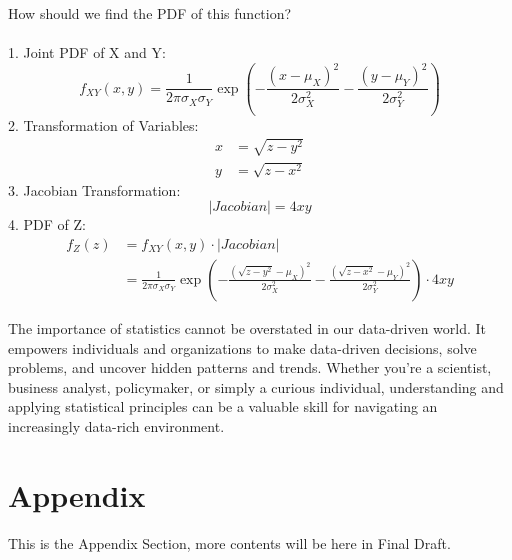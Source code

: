 \documentclass{article}
\begin{document}
How should we find the PDF of this function?\\\\
1. Joint PDF of X and Y:
\begin{equation}
f_{XY}(x, y) = \frac{1}{2\pi\sigma_X\sigma_Y} \exp\left(-\frac{(x-\mu_X)^2}{2\sigma_X^2} - \frac{(y-\mu_Y)^2}{2\sigma_Y^2}\right)
\end{equation}
2. Transformation of Variables:
\begin{align}
x &= \sqrt{z - y^2} \\
y &= \sqrt{z - x^2}
\end{align}
3. Jacobian Transformation:
\begin{equation}
\left|Jacobian\right| = 4xy
\end{equation}
4. PDF of Z:
\begin{align}
f_Z(z) &= f_{XY}(x, y) \cdot \left|Jacobian\right| \\
&= \frac{1}{2\pi\sigma_X\sigma_Y} \exp\left(-\frac{(\sqrt{z - y^2}-\mu_X)^2}{2\sigma_X^2} - \frac{(\sqrt{z - x^2}-\mu_Y)^2}{2\sigma_Y^2}\right) \cdot 4xy
\end{align}

The importance of statistics cannot be overstated in our data-driven world. It empowers individuals and organizations to make data-driven decisions, solve problems, and uncover hidden patterns and trends. Whether you're a scientist, business analyst, policymaker, or simply a curious individual, understanding and applying statistical principles can be a valuable skill for navigating an increasingly data-rich environment.\citep{einstein1905}


\section*{Appendix}
This is the Appendix Section, more contents will be here in Final Draft.



\cite{knuth1984}
\cite{einstein1905}
\end{document}
